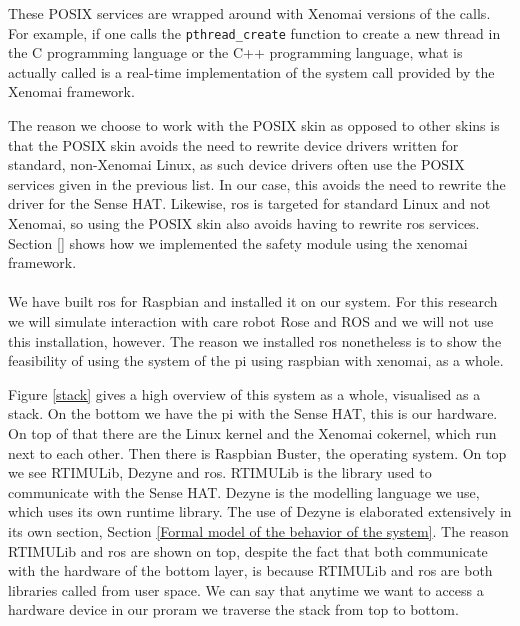 \documentclass[12pt]{scrreprt}
\begin{document}
These POSIX services are wrapped around with Xenomai versions of the calls. For example, if one calls the \texttt{pthread_create} function to create a new thread in the C programming language or the C++ programming language, what is actually called is a real-time implementation of the system call provided by the Xenomai framework.
\par
The reason we choose to work with the POSIX skin as opposed to other skins is that the POSIX skin avoids the need to rewrite device drivers written for standard, non-Xenomai Linux, as such device drivers often use the POSIX services given in the previous list. In our case, this avoids the need to rewrite the driver for the Sense HAT. Likewise, \acrshort{ros} is targeted for standard Linux and not Xenomai, so using the POSIX skin also avoids having to rewrite \acrshort{ros} services. Section \ref{} shows how we implemented the safety module using the xenomai framework.
\\\\
We have built \acrshort{ros} for Raspbian and installed it on our system. For this research we will simulate interaction with care robot Rose and ROS and we will not use this installation, however. The reason we installed \acrshort{ros} nonetheless is to show the feasibility of using the system of the \gls{pi} using raspbian with xenomai, as a whole.
\par
Figure \ref{stack} gives a high overview of this system as a whole, visualised as a stack. On the bottom we have the \gls{pi} with the Sense HAT, this is our hardware. On top of that there are the Linux kernel and the Xenomai cokernel, which run next to each other. Then there is Raspbian Buster, the operating system. On top we see RTIMULib, Dezyne and \acrshort{ros}. RTIMULib is the library used to communicate with the Sense HAT. Dezyne is the modelling language we use, which uses its own runtime library. The use of Dezyne is elaborated extensively in its own section, Section \ref{Formal model of the behavior of the system}. The reason RTIMULib and \acrshort{ros} are shown on top, despite the fact that both communicate with the hardware of the bottom layer, is because RTIMULib and \acrshort{ros} are both libraries called from user space. We can say that anytime we want to access a hardware device in our proram we traverse the stack from top to bottom.
\end{document}

